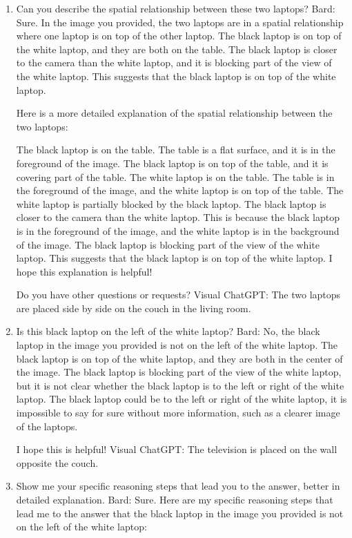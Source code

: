 \begin{enumerate}
    \item Can you describe the spatial relationship between these two laptops?
    \subitem Bard: Sure. In the image you provided, the two laptops are in a spatial relationship where one laptop is on top of the other laptop. The black laptop is on top of the white laptop, and they are both on the table. The black laptop is closer to the camera than the white laptop, and it is blocking part of the view of the white laptop. This suggests that the black laptop is on top of the white laptop.

    Here is a more detailed explanation of the spatial relationship between the two laptops:
    
    The black laptop is on the table. The table is a flat surface, and it is in the foreground of the image. The black laptop is on top of the table, and it is covering part of the table.
    The white laptop is on the table. The table is in the foreground of the image, and the white laptop is on top of the table. The white laptop is partially blocked by the black laptop.
    The black laptop is closer to the camera than the white laptop. This is because the black laptop is in the foreground of the image, and the white laptop is in the background of the image.
    The black laptop is blocking part of the view of the white laptop. This suggests that the black laptop is on top of the white laptop.
    I hope this explanation is helpful!
    
    Do you have other questions or requests?
    \subitem Visual ChatGPT: The two laptops are placed side by side on the couch in the living room.
    \item Is this black laptop on the left of the white laptop?
    \subitem Bard: No, the black laptop in the image you provided is not on the left of the white laptop. The black laptop is on top of the white laptop, and they are both in the center of the image. The black laptop is blocking part of the view of the white laptop, but it is not clear whether the black laptop is to the left or right of the white laptop. The black laptop could be to the left or right of the white laptop, it is impossible to say for sure without more information, such as a clearer image of the laptops.

    I hope this is helpful!
    \subitem Visual ChatGPT: The television is placed on the wall opposite the couch.
    \item Show me your specific reasoning steps that lead you to the answer, better in detailed explanation.
    \subitem Bard: Sure. Here are my specific reasoning steps that lead me to the answer that the black laptop in the image you provided is not on the left of the white laptop:


\end{enumerate}
